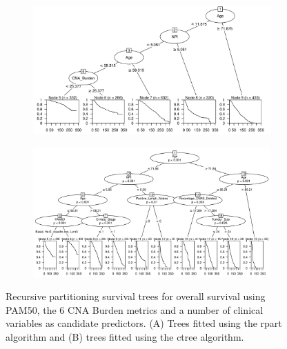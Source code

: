 \begin{figure}[!htb]
\centering

\vspace{1cm}

\begin{subfigure}{\textwidth}
\subcaption{}
\includegraphics[width=1\textwidth]{../figures/Appendices/Appendix_B/Clin_PartyKit_Survival_Burden_OS_PAM50.png}
\end{subfigure}

\vspace{2cm}

\begin{subfigure}{\textwidth}
\subcaption{}
\includegraphics[width=1\textwidth]{../figures/Appendices/Appendix_B/Clin_Ctree_Survival_Burden_OS_PAM50.png}
\end{subfigure}

\vspace{1cm}

\caption[Recursive partitioning survival trees for overall survival using PAM50, the 6 CNA Burden metrics and a number of clinical variables as candidate predictors.]{Recursive partitioning survival trees for overall survival using PAM50, the 6 CNA Burden metrics and a number of clinical variables as candidate predictors. (A) Trees fitted using the rpart algorithm and (B) trees fitted using the ctree algorithm.}
\end{figure}

